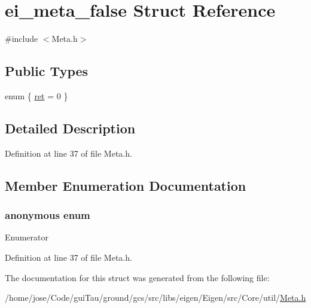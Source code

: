 \hypertarget{structei__meta__false}{\section{ei\-\_\-meta\-\_\-false Struct Reference}
\label{structei__meta__false}
}


{\ttfamily \#include $<$Meta.\-h$>$}

\subsection*{Public Types}
\begin{DoxyCompactItemize}
\item 
enum \{ \hyperlink{structei__meta__false_a1863ddd9d5ff9a97dd7bb779eb9193f6a37d8d705ea6a8b561a6dad477a7daa19}{ret} = 0
 \}
\end{DoxyCompactItemize}


\subsection{Detailed Description}


Definition at line 37 of file Meta.\-h.



\subsection{Member Enumeration Documentation}
\hypertarget{structei__meta__false_a1863ddd9d5ff9a97dd7bb779eb9193f6}{\subsubsection[{anonymous enum}]{\setlength{\rightskip}{0pt plus 5cm}anonymous enum}}\label{structei__meta__false_a1863ddd9d5ff9a97dd7bb779eb9193f6}
\begin{Desc}
\item[Enumerator]\par
\begin{description}
\item[{\em 
\hypertarget{structei__meta__false_a1863ddd9d5ff9a97dd7bb779eb9193f6a37d8d705ea6a8b561a6dad477a7daa19}{ret}\label{structei__meta__false_a1863ddd9d5ff9a97dd7bb779eb9193f6a37d8d705ea6a8b561a6dad477a7daa19}
}]\end{description}
\end{Desc}


Definition at line 37 of file Meta.\-h.



The documentation for this struct was generated from the following file\-:\begin{DoxyCompactItemize}
\item 
/home/jose/\-Code/gui\-Tau/ground/gcs/src/libs/eigen/\-Eigen/src/\-Core/util/\hyperlink{_meta_8h}{Meta.\-h}\end{DoxyCompactItemize}
